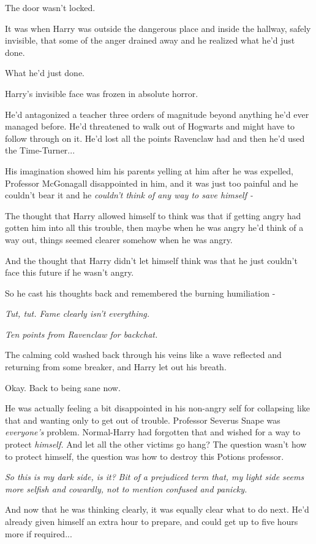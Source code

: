 The door wasn't locked.

It was when Harry was outside the dangerous place and inside the
hallway, safely invisible, that some of the anger drained away and he
realized what he'd just done.

What he'd just done.

Harry's invisible face was frozen in absolute horror.

He'd antagonized a teacher three orders of magnitude beyond anything
he'd ever managed before. He'd threatened to walk out of Hogwarts and
might have to follow through on it. He'd lost all the points Ravenclaw
had and then he'd used the Time-Turner...

His imagination showed him his parents yelling at him after he was
expelled, Professor McGonagall disappointed in him, and it was just too
painful and he couldn't bear it and he \emph{couldn't think of any way
to save himself -}

The thought that Harry allowed himself to think was that if getting
angry had gotten him into all this trouble, then maybe when he was angry
he'd think of a way out, things seemed clearer somehow when he was
angry.

And the thought that Harry didn't let himself think was that he just
couldn't face this future if he wasn't angry.

So he cast his thoughts back and remembered the burning humiliation -

\emph{Tut, tut. Fame clearly isn't everything.}

\emph{Ten points from Ravenclaw for backchat.}

The calming cold washed back through his veins like a wave reflected and
returning from some breaker, and Harry let out his breath.

Okay. Back to being sane now.

He was actually feeling a bit disappointed in his non-angry self for
collapsing like that and wanting only to get out of trouble. Professor
Severus Snape was \emph{everyone's} problem. Normal-Harry had forgotten
that and wished for a way to protect \emph{himself.} And let all the
other victims go hang? The question wasn't how to protect himself, the
question was how to destroy this Potions professor.

\emph{So this is my dark side, is it?} \emph{Bit of a prejudiced term
that, my light side seems more selfish and cowardly, not to mention
confused and panicky.}

And now that he was thinking clearly, it was equally clear what to do
next. He'd already given himself an extra hour to prepare, and could get
up to five hours more if required...

